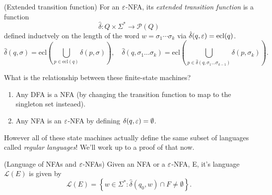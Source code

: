 \documentclass[tikx, border = 10pt]{article}
\begin{document}
\begin{definition}
	(Extended transition function) For an $ \varepsilon $-NFA, its \textit{extended transition function} is a function
	\[
	  \hat\delta: Q\times \Sigma^* \to \mathcal P(Q)
	\]
	defined inductvely on the length of the word $ w = \sigma_1 \cdots \sigma_k $ via $ \hat \delta(q,\varepsilon) = \mathrm{ecl}(q) $.
	\[
		\hat\delta(q,\sigma) = \mathrm{ecl}\left(\bigcup_{p\in \mathrm{ecl}(q)} \delta(p,\sigma)\right),\quad \hat\delta(q,\sigma_1\dots \sigma_k) = \mathrm{ecl}\left( \bigcup_{p\in \hat \delta(q,\sigma_1\dots \sigma_{k-1})} \delta(p,\sigma_k)\right).
	\]
\end{definition}
What is the relationship between these finite-state machines? 
\begin{enumerate}
	\item Any DFA is a NFA (by changing the transition function to map to the singleton set insteaed).
	\item Any NFA is an $ \varepsilon $-NFA by defining $ \delta(q,\varepsilon) = \emptyset $.
\end{enumerate}
However all of these state machines actually define the same subset of languages called \textit{regular languages}! We'll work up to a proof of that now.
\begin{definition}
	(Language of NFAs and $ \varepsilon $-NFAs) Given an NFA or a $ \varepsilon $-NFA, E, it's language $ \mathcal L(E) $ is given by
	\[
		\mathcal L(E) = \left\{ w\in \Sigma^* : \hat\delta(q_0,w)\cap F\neq \emptyset \right\}.
	\]
\end{definition}
\end{document}
